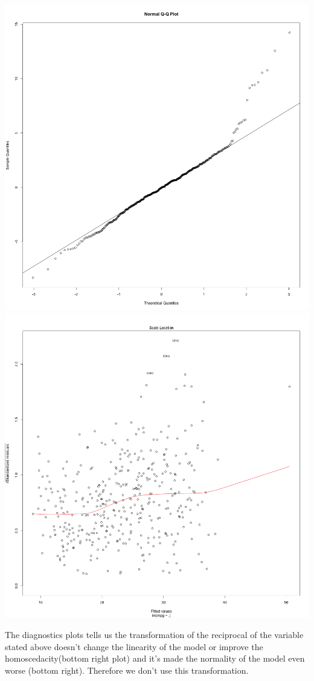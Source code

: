 \documentclass[11pt]{article} %
\begin{document}
\begin{center}
\includegraphics[scale=0.13]{2_QQplot}
\includegraphics[scale=0.13]{2_Variance}
\end{center}
The diagnostics plots tells us the transformation of the reciprocal of the variable stated above doesn't change the linearity of the model or improve the homoscedacity(bottom right plot) and it's made the normality of the model even worse (bottom right). Therefore we don't use this transformation.\\
\end{document}

